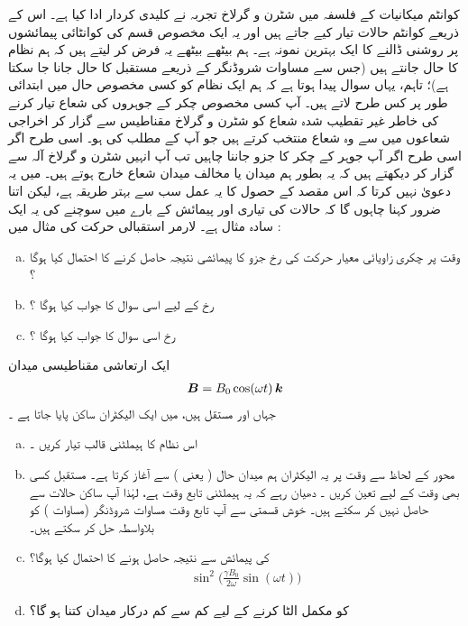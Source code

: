  کوانٹم میکانیات کے  فلسفہ  میں شٹرن و گرلاخ تجربہ نے کلیدی کردار ادا کیا ہے۔ اس کے ذریعے کوانٹم حالات تیار کیے جاتے ہیں اور یہ ایک مخصوص قسم کی کوانٹائی پیمائشوں پر روشنی ڈالنے کا ایک بہترین نمونہ ہے۔  ہم بیٹھے بیٹھے یہ فرض کر لیتے ہیں کہ ہم نظام کا  حال  جانتے ہیں  (جس سے مساوات شروڈنگر کے ذریعے مستقبل کا حال جانا جا سکتا ہے)؛  تاہم، یہاں    سوال پیدا ہوتا ہے کہ ہم ایک  نظام کو کسی مخصوص حال میں ابتدائی طور  پر  کس طرح   لاتے ہیں۔ آپ کسی مخصوص چکر کے جوہروں کی شعاع تیار کرنے کی خاطر غیر تقطیب  شدہ  شعاع کو شٹرن و گرلاخ مقناطیس سے گزار کر اخراجی شعاعوں میں سے وہ شعاع منتخب کرتے ہیں جو آپ کے مطلب کی ہو۔ اسی طرح اگر اسی طرح اگر آپ جوہر کے چکر کا  جزو جاننا چاہیں تب آپ انہیں شٹرن و گرلاخ آلہ  سے گزار کر دیکھتے ہیں کہ یہ بطور ہم میدان یا مخالف میدان شعاع خارج ہوتے ہیں۔ میں یہ دعویٰ  نہیں کرتا کہ اس مقصد کے حصول کا یہ عمل سب سے بہتر طریقہ ہے، لیکن اتنا ضرور کہنا چاہوں گا کہ حالات کی تیاری اور پیمائش کے بارے میں سوچنے کی  یہ ایک سادہ  مثال ہے۔ 
لارمر استقبالی حرکت کی    مثال    میں :
\begin{enumerate}[a.]
\item
وقت  پر چکری زاویائی معیار حرکت کی   رخ جزو کا  پیمائشی نتیجہ  حاصل کرنے کا احتمال کیا ہوگا ؟
\item
{} رخ کے لیے اسی سوال کا جواب کیا ہوگا ؟
\item 
{} رخ اسی سوال کا جواب کیا ہوگا ؟
\end{enumerate}
ایک ارتعاشی مقناطیسی میدان 
\begin{align*}
{\ensuremath{{\boldsymbol{B}}}} = B_0 \cos(\omega t) \,{\boldsymbol{k}}
\end{align*}
جہاں  اور  مستقل ہیں، میں ایک الیکٹران ساکن پایا جاتا ہے ۔
\begin{enumerate}[a.]
\item
اس نظام کا ہیملٹنی قالب تیار کریں ۔
\item
محور  کے لحاظ سے وقت  پر یہ الیکٹران  ہم  میدان حال ( یعنی )    سے آغاز  کرتا ہے۔ مستقبل   کسی بھی وقت کے لیے  تعین کریں ۔ دھیان رہے کہ یہ ہیملٹنی تابع وقت ہے، لہٰذا آپ ساکن حالات سے  حاصل نہیں کر سکتے ہیں۔ خوش قسمتی سے آپ تابع وقت مساوات شروڈنگر (مساوات  )  کو بلاواسطہ حل کر سکتے ہیں۔ 
\item
{} کی پیمائش سے   نتیجہ حاصل  ہونے کا احتمال کیا ہوگا؟  
\begin{align*}
\sin^2 \big ( \frac{\gamma B_0}{2 \omega} \sin(\omega t) \big )
\end{align*}
\item
{} کو مکمل الٹا کرنے کے لیے کم سے کم  درکار میدان  کتنا ہو گا؟   
\end{enumerate}
